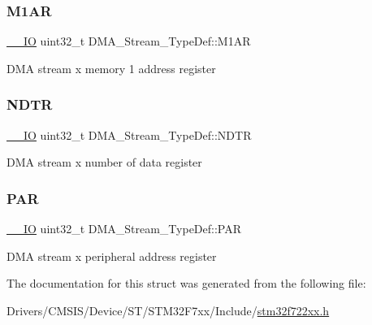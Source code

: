 \subsubsection{\texorpdfstring{M1AR}{M1AR}}
{\footnotesize\ttfamily \mbox{\hyperlink{core__sc300_8h_aec43007d9998a0a0e01faede4133d6be}{\+\_\+\+\_\+\+IO}} uint32\+\_\+t D\+M\+A\+\_\+\+Stream\+\_\+\+Type\+Def\+::\+M1\+AR}

D\+MA stream x memory 1 address register \mbox{\label{struct_d_m_a___stream___type_def_a2cc2a52628182f9e79ab1e49bb78a1eb}} 
\subsubsection{\texorpdfstring{NDTR}{NDTR}}
{\footnotesize\ttfamily \mbox{\hyperlink{core__sc300_8h_aec43007d9998a0a0e01faede4133d6be}{\+\_\+\+\_\+\+IO}} uint32\+\_\+t D\+M\+A\+\_\+\+Stream\+\_\+\+Type\+Def\+::\+N\+D\+TR}

D\+MA stream x number of data register \mbox{\label{struct_d_m_a___stream___type_def_adbeac1d47cb85ab52dac71d520273947}} 
\subsubsection{\texorpdfstring{PAR}{PAR}}
{\footnotesize\ttfamily \mbox{\hyperlink{core__sc300_8h_aec43007d9998a0a0e01faede4133d6be}{\+\_\+\+\_\+\+IO}} uint32\+\_\+t D\+M\+A\+\_\+\+Stream\+\_\+\+Type\+Def\+::\+P\+AR}

D\+MA stream x peripheral address register 

The documentation for this struct was generated from the following file\+:\begin{DoxyCompactItemize}
\item 
Drivers/\+C\+M\+S\+I\+S/\+Device/\+S\+T/\+S\+T\+M32\+F7xx/\+Include/\mbox{\hyperlink{stm32f722xx_8h}{stm32f722xx.\+h}}\end{DoxyCompactItemize}

